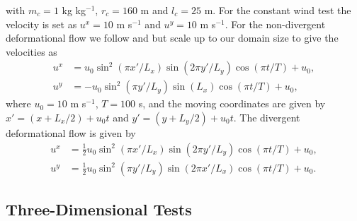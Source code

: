 \documentclass[11pt,a4paper]{article}
\begin{document}
with $m_c=1$ kg kg$^{-1}$, $r_c=160$ m and $l_c=25$ m.
For the constant wind test the velocity is set as $u^x=10$ m s$^{-1}$ and $u^y=10$ m s$^{-1}$. For the non-divergent deformational flow we follow \cite{skamarock2006limiters} and \citet{kent2020positive} but scale up to our domain size to give the velocities as
\begin{subequations}
\begin{align}
u^x & =  u_0 \sin^2(\pi x'/L_x)\sin(2 \pi y'/L_y)\cos(\pi t/T)+u_0,\\ 
u^y & = -u_0 \sin^2(\pi y'/L_y)\sin(L_x)\cos(\pi t/T)+u_0,
\end{align}
\end{subequations}
where $u_0=10$ m s$^{-1}$, $T=100$ s, and the moving coordinates are given by $x' = (x+L_x/2) + u_0 t$ and $y' = (y+L_y/2) + u_0 t$. The divergent deformational flow is given by
\begin{subequations}
\begin{align}
u^x & =  \tfrac{1}{2}u_0 \sin^2(\pi x'/L_x)\sin(2 \pi y'/L_y)\cos(\pi t/T)+u_0,\\ 
u^y & = \tfrac{1}{2}u_0 \sin^2(\pi y'/L_y)\sin(2 \pi x'/L_x)\cos(\pi t/T)+u_0.
\end{align}
\end{subequations}

\subsection{Three-Dimensional Tests}
\end{document}
